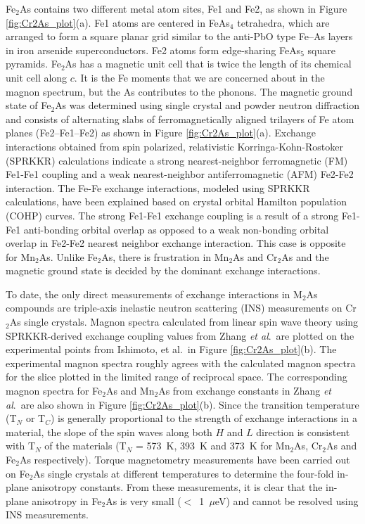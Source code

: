 \documentclass[10pt,doublespacing,edeposit]{uiucthesis2020}
\begin{document}
\begin{mainmatter}
Fe$_2$As contains two different metal atom sites, Fe1 and Fe2, as shown in Figure \ref{fig:Cr2As_plot}(a). Fe1 atoms are centered in FeAs$_4$ tetrahedra, which are arranged to form a square planar grid similar to the anti-PbO type Fe--As layers in iron arsenide superconductors. 
Fe2 atoms form edge-sharing FeAs$_5$ square pyramids. 
Fe$_2$As has a magnetic unit cell that is twice the length of its chemical unit cell along $c$.\cite{Zhang2013,Katsuraki1966}  It is the Fe moments that we are concerned about in the magnon spectrum, but the As contributes to the phonons. The magnetic ground state of Fe$_2$As was determined using single crystal and powder neutron diffraction and consists of alternating slabs of ferromagnetically aligned trilayers of Fe atom planes (Fe2--Fe1--Fe2) as shown in Figure \ref{fig:Cr2As_plot}(a).\cite{Katsuraki1966}
Exchange interactions obtained from  spin polarized, relativistic Korringa-Kohn-Rostoker (SPRKKR)  calculations indicate a strong nearest-neighbor ferromagnetic (FM) Fe1-Fe1 coupling and a weak nearest-neighbor antiferromagnetic (AFM) Fe2-Fe2 interaction.\cite{Zhang2013} 
The Fe-Fe exchange interactions, modeled using SPRKKR calculations, have been explained based on crystal orbital Hamilton population (COHP) curves. The strong Fe1-Fe1 exchange coupling is a result of a strong Fe1-Fe1 anti-bonding orbital overlap as opposed to a weak non-bonding orbital overlap in Fe2-Fe2 nearest neighbor exchange interaction. This case is opposite for Mn$_2$As.\cite{Zhang2013} 
Unlike Fe$_2$As, there is frustration in Mn$_2$As and Cr$_2$As and the magnetic ground state is decided by the dominant exchange interactions.\cite{Zhang2013}


To date, the only direct measurements of exchange interactions in M$_2$As compounds are triple-axis inelastic neutron scattering (INS) measurements on Cr$_2$As single crystals.\cite{Yuzuri1960,Ishimoto1995} 
Magnon spectra calculated from linear spin wave theory using SPRKKR-derived exchange coupling values from Zhang \emph{et al}.\ are plotted on the experimental points from Ishimoto, et al.\ in Figure \ref{fig:Cr2As_plot}(b).\cite{Zhang2013,Ishimoto1995} The experimental magnon spectra roughly agrees with the calculated magnon spectra for the slice plotted in the limited range of reciprocal space. The corresponding magnon spectra for Fe$_2$As and Mn$_2$As from exchange constants in Zhang \emph{et al}.\ are also shown in Figure \ref{fig:Cr2As_plot}(b). 
Since the transition temperature (T$_N$ or T$_C$) is generally proportional to the strength of exchange interactions in a material,\cite{Krishnan2016} the slope of the spin waves along both $H$ and $L$ direction is consistent with T$_N$ of the materials (T$_N$ = 573~K, 393~K and 373~K for Mn$_2$As, Cr$_2$As and Fe$_2$As respectively).\cite{Zhang2013}
Torque magnetometry measurements have been carried out on Fe$_2$As single crystals at different temperatures to determine the four-fold in-plane anisotropy constants.\cite{Yang2020,Achiwa1967} From these measurements, it is clear that the in-plane anisotropy in Fe$_2$As is very small ($<$~1~$\mu$eV) and cannot be resolved using INS measurements. 


\end{mainmatter}
\end{document}
